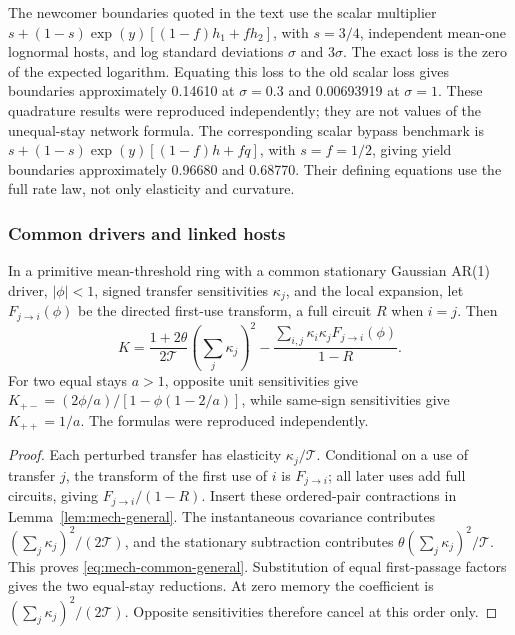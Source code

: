 \begin{remark}\label{rem:mech-scalar-routes}
The newcomer boundaries quoted in the text use the scalar multiplier
\(s+(1-s)\exp(y)[(1-f)h_1+fh_2]\), with \(s=3/4\), independent mean-one lognormal hosts, and log standard deviations \(\sigma\) and \(3\sigma\). The exact loss is the zero of the expected logarithm. Equating this loss to the old scalar loss gives boundaries approximately 0.14610 at \(\sigma=0.3\) and 0.00693919 at \(\sigma=1\). These quadrature results were reproduced independently; they are not values of the unequal-stay network formula. The corresponding scalar bypass benchmark is \(s+(1-s)\exp(y)[(1-f)h+fq]\), with \(s=f=1/2\), giving yield boundaries approximately 0.96680 and 0.68770. Their defining equations use the full rate law, not only elasticity and curvature.
\end{remark}

\subsubsection{Common drivers and linked hosts}\label{app:mech-common}
\begin{lemma}\label{lem:mech-common}
In a primitive mean-threshold ring with a common stationary Gaussian AR(1) driver, \(|\phi|<1\), signed transfer sensitivities \(\kappa_j\), and the local expansion, let \(F_{j\to i}(\phi)\) be the directed first-use transform, a full circuit \(R\) when \(i=j\). Then
\begin{equation}\label{eq:mech-common-general}
 K=\frac{1+2\theta}{2\mathcal T}\left(\sum_j\kappa_j\right)^2
 -\frac{\sum_{i,j}\kappa_i\kappa_jF_{j\to i}(\phi)}{1-R}.
\end{equation}
For two equal stays \(a>1\), opposite unit sensitivities give
\(K_{+-}=(2\phi/a)/[1-\phi(1-2/a)]\), while same-sign sensitivities give \(K_{++}=1/a\). The formulas were reproduced independently.
\end{lemma}
\begin{proof}
Each perturbed transfer has elasticity \(\kappa_j/\mathcal T\). Conditional on a use of transfer \(j\), the transform of the first use of \(i\) is \(F_{j\to i}\); all later uses add full circuits, giving \(F_{j\to i}/(1-R)\). Insert these ordered-pair contractions in Lemma~\ref{lem:mech-general}. The instantaneous covariance contributes \((\sum_j\kappa_j)^2/(2\mathcal T)\), and the stationary subtraction contributes \(\theta(\sum_j\kappa_j)^2/\mathcal T\). This proves \eqref{eq:mech-common-general}. Substitution of equal first-passage factors gives the two equal-stay reductions. At zero memory the coefficient is \((\sum_j\kappa_j)^2/(2\mathcal T)\). Opposite sensitivities therefore cancel at this order only.
\end{proof}

